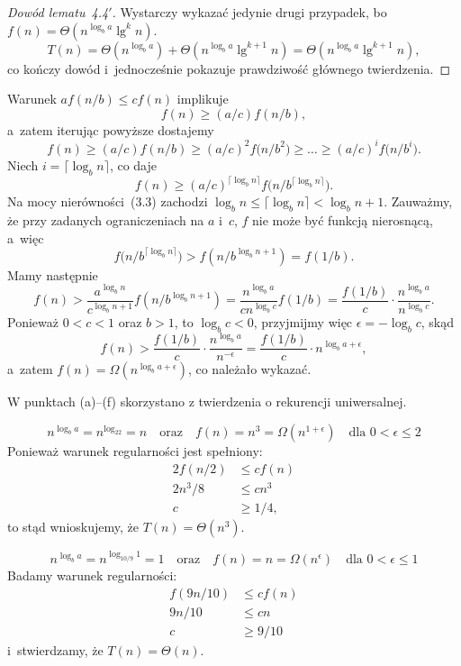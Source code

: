 \begin{proof}[Dowód lematu~4.4\/$'$]
	Wystarczy wykazać jedynie drugi przypadek, bo $f(n)=\Theta(n^{\log_ba}\lg^kn)$.
	\[
		T(n) = \Theta(n^{\log_ba})+\Theta(n^{\log_ba}\lg^{k+1}n) = \Theta(n^{\log_ba}\lg^{k+1}n),
	\]
	co kończy dowód i~jednocześnie pokazuje prawdziwość głównego twierdzenia.
\end{proof}

\exercise %
Warunek $af(n/b)\le cf(n)$ implikuje
\[
	f(n) \ge (a/c)f(n/b),
\]
a~zatem iterując powyższe dostajemy
\[
	f(n) \ge (a/c)f(n/b) \ge (a/c)^2f\bigl(n/b^2\bigr) \ge \dots \ge (a/c)^if\bigl(n/b^i\bigr).
\]
Niech $i=\lceil\log_bn\rceil$, co daje
\[
	f(n) \ge (a/c)^{\lceil\log_bn\rceil}f\bigl(n/b^{\lceil\log_bn\rceil}\bigr).
\]
Na mocy nierówności~(3.3) zachodzi $\log_bn\le\lceil\log_b n\rceil<\log_bn+1$. Zauważmy, że przy zadanych ograniczeniach na $a$ i~$c$, $f$ nie może być funkcją nierosnącą, a~więc
\[
    f\bigl(n/b^{\lceil\log_bn\rceil}\bigr) > f(n/b^{\log_bn+1}) = f(1/b).
\]
Mamy następnie
\[
	f(n) > \frac{a^{\log_bn}}{c^{\log_bn+1}}f(n/b^{\log_bn+1}) = \frac{n^{\log_ba}}{cn^{\log_bc}}f(1/b) = \frac{f(1/b)}{c}\cdot\frac{n^{\log_ba}}{n^{\log_bc}}.
\]
Ponieważ $0<c<1$ oraz $b>1$, to $\log_bc<0$, przyjmijmy więc $\epsilon=-\log_bc$, skąd
\[
	f(n) > \frac{f(1/b)}{c}\cdot\frac{n^{\log_ba}}{n^{-\epsilon}} = \frac{f(1/b)}{c}\cdot n^{\log_ba+\epsilon},
\]
a~zatem $f(n)=\Omega(n^{\log_ba+\epsilon})$, co należało wykazać.

\problems

W punktach (a)\nobreakdash--(f) skorzystano z twierdzenia o rekurencji uniwersalnej.

\subproblem %
\[
	n^{\log_ba} = n^{\log_22} = n \quad\text{oraz}\quad f(n) = n^3 = \Omega(n^{1+\epsilon}) \quad\text{dla $0<\epsilon\le2$}
\]
Ponieważ warunek regularności jest spełniony:
\begin{align*}
	2f(n/2) &\le cf(n) \\
	2n^3\!/8 &\le cn^3 \\
	c &\ge 1/4,
\end{align*}
to stąd wnioskujemy, że $T(n)=\Theta(n^3)$.

\subproblem %
\[
	n^{\log_ba} = n^{\log_{10/9}1} = 1 \quad\text{oraz}\quad f(n) = n = \Omega(n^\epsilon) \quad\text{dla $0<\epsilon\le1$}
\]
Badamy warunek regularności:
\begin{align*}
	f(9n/10) &\le cf(n) \\
	9n/10 &\le cn \\
	c &\ge 9/10
\end{align*}
i~stwierdzamy, że $T(n)=\Theta(n)$.

